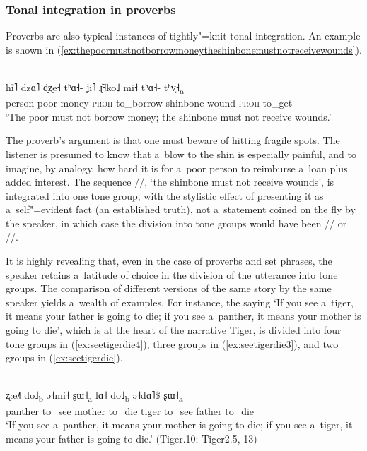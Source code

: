 \subsubsection{Tonal integration in proverbs}
\label{sec:tonalintegrationinproverbs}

Proverbs are also typical instances of tightly"=knit tonal integration. An example is shown in
(\ref{ex:thepoormustnotborrowmoneytheshinbonemustnotreceivewounds}).
\begin{exe}
  \ex
  \label{ex:thepoormustnotborrowmoneytheshinbonemustnotreceivewounds}
  \\
  \gll hĩ˥	dzɑ˥	ɖʐe˧	tʰɑ˧-	ʝi˥	ɻ̍̃˧ko˩	mi˧	tʰɑ˧-	tʰv̩˧\textsubscript{a}\\
  person	poor	money	\textsc{proh}	to\_borrow	shinbone	wound	\textsc{proh}	to\_get\\
  \glt ‘The poor must not borrow money; the shinbone must not receive wounds.’
\end{exe}

The proverb’s argument is that one must beware of hitting fragile spots. The listener is presumed to
know that a~blow to the shin is especially painful, and to imagine, by {analogy}, how hard it is for
a~poor person to reimburse a~loan plus added interest. The sequence //,
‘the shinbone must not receive wounds’, is integrated into one tone group, with the stylistic
effect of presenting it as a~self"=evident fact (an established truth), not a~statement coined on the
fly by the speaker, in which case the division into tone groups would have been // or //.

It is highly revealing that, even in the case of proverbs and set phrases, the speaker retains
a~latitude of choice in the division of the utterance into tone groups. The comparison of different
versions of the same story by the same speaker yields a~wealth of examples. For instance, the saying ‘If you see a~tiger, it means your father is going
to die; if you see a~panther, it means your mother is going to die’, which is at the heart of the
narrative Tiger, is divided into four tone groups in (\ref{ex:seetigerdie4}), three groups in (\ref{ex:seetigerdie3}), and two groups in (\ref{ex:seetigerdie}). 

\begin{exe}
	\ex
	\label{ex:seetigerdie4}
	\\
	\gll ʐæ˩˥			do˩\textsubscript{b}			ə˧mi˧		ʂɯ˧\textsubscript{a}		lɑ˧		do˩\textsubscript{b}		ə˧dɑ˥\$		ʂɯ˧\textsubscript{a}\\
	panther		to\_see	mother		to\_die		tiger			to\_see					father		to\_die\\
	\glt ‘If you see a~panther, it means your mother is going to die; if you see a~tiger, it means your father is going
	to die.’ (Tiger.10; Tiger2.5, 13)
\end{exe}


